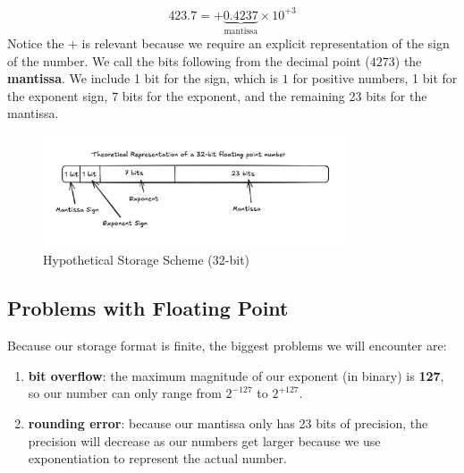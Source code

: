 \begin{equation*}
  423.7 = +\underbrace{0.4237}_{\text{mantissa}} \times 10^{+3}
\end{equation*}
Notice the $+$ is relevant because we require an explicit representation of the
sign of the number. We call the bits following from the decimal point ($4273$) 
the \textbf{mantissa}.
We include 1 bit for the sign, which is $1$ for positive numbers, 1 bit for the
exponent sign, 7 bits for the exponent, and the remaining 23 bits for the
mantissa.

\begin{figure}[h]
  \centering
  \includegraphics[width=0.8\textwidth]{./assets/fake_ieee754.png}
  \caption{Hypothetical Storage Scheme (32-bit)}
\end{figure}

\subsection{Problems with Floating Point}
\noindent
\begin{minipage}{\textwidth}
Because our storage format is finite, the biggest problems we will encounter
are:
\begin{enumerate}
  \item \textbf{bit overflow}: the maximum magnitude of our exponent (in binary)
    is \textbf{127}, so our number can only range from $2^{-127}$ to $2^{+127}$.
  \item \textbf{rounding error}: because our mantissa only has 23 bits of 
    precision, the precision will decrease as our numbers get larger because we 
    use exponentiation to represent the actual number.
\end{enumerate}
\end{minipage}


